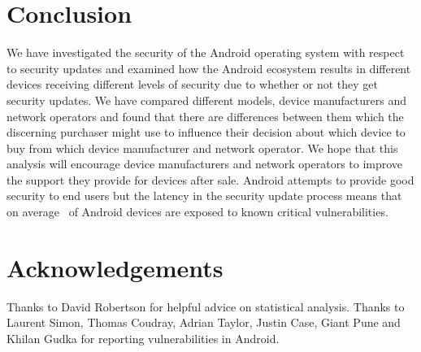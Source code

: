 \documentclass[conference,a4paper,twoside]{IEEEtran}
\begin{document}
\section{Conclusion}
\label{sec:conclusion}
We have investigated the security of the Android operating system with respect to security updates and examined how the Android ecosystem results in different devices receiving different levels of security due to whether or not they get security updates.
We have compared different models, device manufacturers and network operators and found that there are differences between them which the discerning purchaser might use to influence their decision about which device to buy from which device manufacturer and network operator.
We hope that this analysis will encourage device manufacturers and network operators to improve the support they provide for devices after sale.
Android attempts to provide good security to end users but the latency in the security update process means that on average \daMeanInsecurityPerc\ of Android devices are exposed to known critical vulnerabilities.


\section*{Acknowledgements}
Thanks to David Robertson for helpful advice on statistical analysis.
Thanks to Laurent Simon, Thomas Coudray, Adrian Taylor, Justin Case, Giant Pune and Khilan Gudka for reporting vulnerabilities in Android.


\printbibliography


\listoftodos
\end{document}
